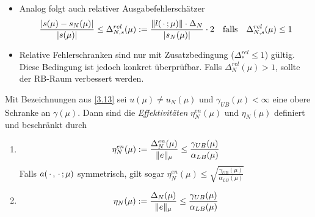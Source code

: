 \begin{bem} \beginwithlistbem
	\begin{itemize}
		\item Analog folgt auch relativer Ausgabefehlerschätzer
			\[
				\frac{|s(\mu)-s_N(\mu)|}{|s(\mu)|} \leq \Delta_{N,s}^{rel}(\mu) := \frac{\|l(\,\cdot\,;\mu)\| \cdot \Delta_N}{|s_N(\mu)|} \cdot 2 \quad \text{falls} \quad \Delta_{N,s}^{rel}(\mu) \leq 1
			\]
		\item Relative Fehlerschranken sind nur mit Zusatzbedingung ($\Delta_*^{rel} \leq 1$) gültig.
			Diese Bedingung ist jedoch konkret überprüfbar.
			Falls $\Delta_N^{rel}(\mu) > 1$, sollte der RB-Raum verbessert werden.
	\end{itemize}
\end{bem}

\begin{satz} \label{3.16}
	Mit Bezeichnungen aus \ref{3.13} sei $u(\mu) \neq u_N(\mu)$ und $\gamma_{UB}(\mu) < \infty$ eine obere Schranke an $\gamma(\mu)$.
	Dann sind die \emph{Effektivitäten} $\eta_N^{en}(\mu)$ und $\eta_N(\mu)$ definiert und beschränkt durch
	\begin{enumerate}
		\item
			\[
				\eta_N^{en}(\mu) := \frac{\Delta_N^{en}(\mu)}{\|e\|_\mu} \leq \frac{\gamma_{UB}(\mu)}{\alpha_{LB}(\mu)}
			\]
			Falls $a(\,\cdot\,,\,\cdot\,;\mu)$ symmetrisch, gilt sogar $\eta_N^{en}(\mu) \leq \sqrt{\frac{\gamma_{UB}(\mu)}{\alpha_{LB}(\mu)}}$
		\item
			\[
				\eta_N(\mu) := \frac{\Delta_N(\mu)}{\|e\|_\mu} \leq \frac{\gamma_{UB}(\mu)}{\alpha_{LB}(\mu)}
			\]
	\end{enumerate}


\end{satz}

